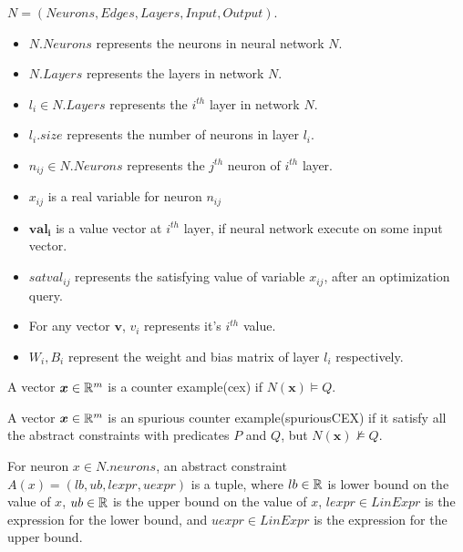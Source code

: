 \begin{df}
  $N = (Neurons, Edges, Layers, Input, Output )$.
  \begin{itemize}
    \item $N.Neurons$ represents the neurons in neural network $N$.
    \item $N.Layers$ represents the layers in network $N$.
    \item $l_i \in N.Layers$ represents the $i^{th}$ layer in network $N$. 
    \item $l_i.size$ represents the number of neurons in layer $l_i$. 
    \item $n_{ij} \in N.Neurons$ represents the $j^{th}$ neuron of $i^{th}$ layer.
    \item $x_{ij}$ is a real variable for neuron $n_{ij}$
    \item $\boldsymbol{val_{i}}$ is a value vector at $i^{th}$ layer, if neural network execute on some input vector.
    \item $satval_{ij}$ represents the satisfying value of variable $x_{ij}$, after an optimization query.
    \item For any vector $\boldsymbol{v}$, $v_i$ represents it's $i^{th}$ value.  
    \item $W_i, B_i$ represent the weight and bias matrix of layer $l_i$ respectively. 
  \end{itemize}
\end{df}

\begin{df}
  A vector $\boldsymbol{x} \in \mathbb{R}^m$ is a counter example(cex) if $N(\boldsymbol{x}) \models Q$.  
\end{df}

\begin{df}
  A vector $\boldsymbol{x} \in \mathbb{R}^m$ is an spurious counter example(spuriousCEX) if it satisfy all the abstract constraints
  with predicates $P$ and $Q$, but $N(\boldsymbol{x}) \nvDash Q$. 
\end{df}


\begin{df}
  For neuron $x \in N.neurons$,
  an abstract constraint $A(x) = (lb,ub, lexpr, uexpr)$ is a tuple, where
  $lb \in \mathbb{R}$ is lower bound on the value of $x$,
  $ub \in \mathbb{R}$ is the upper bound on the value of  $x$,
  $lexpr \in LinExpr$ is the expression for the lower bound, and
  $uexpr \in LinExpr$ is the expression for the upper bound.
\end{df}

